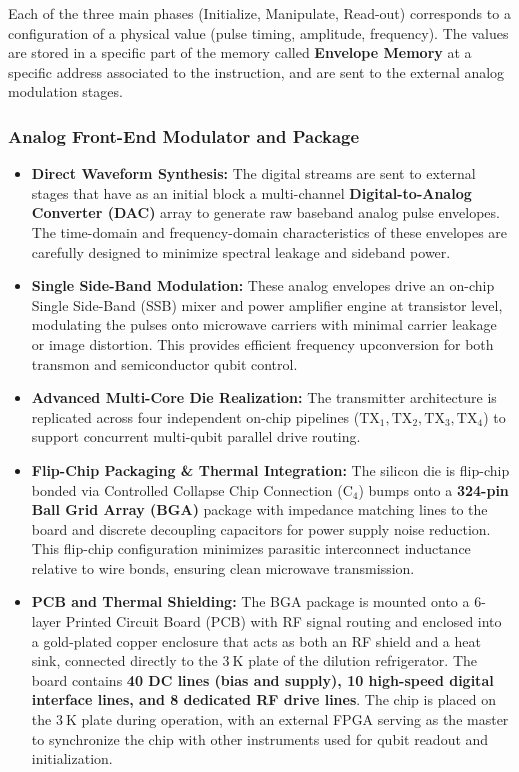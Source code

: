 \documentclass[
]{article}
\providecommand{\tightlist}{%
  \setlength{\itemsep}{0pt}\setlength{\parskip}{0pt}}
\begin{document}
Each of the three main phases (Initialize, Manipulate, Read-out)
corresponds to a configuration of a physical value (pulse timing,
amplitude, frequency). The values are stored in a specific part of the
memory called \textbf{Envelope Memory} at a specific address associated
to the instruction, and are sent to the external analog modulation
stages.

\subsubsection{Analog Front-End Modulator and
Package}\label{analog-front-end-modulator-and-package}

\begin{itemize}
\tightlist
\item
  \textbf{Direct Waveform Synthesis:} The digital streams are sent to
  external stages that have as an initial block a multi-channel
  \textbf{Digital-to-Analog Converter (DAC)} array to generate raw
  baseband analog pulse envelopes. The time-domain and frequency-domain
  characteristics of these envelopes are carefully designed to minimize
  spectral leakage and sideband power.
\item
  \textbf{Single Side-Band Modulation:} These analog envelopes drive an
  on-chip Single Side-Band (SSB) mixer and power amplifier engine at
  transistor level, modulating the pulses onto microwave carriers with
  minimal carrier leakage or image distortion. This provides efficient
  frequency upconversion for both transmon and semiconductor qubit
  control.
\item
  \textbf{Advanced Multi-Core Die Realization:} The transmitter
  architecture is replicated across four independent on-chip pipelines
  (\(\text{TX}_1, \text{TX}_2, \text{TX}_3, \text{TX}_4\)) to support
  concurrent multi-qubit parallel drive routing.
\item
  \textbf{Flip-Chip Packaging \& Thermal Integration:} The silicon die
  is flip-chip bonded via Controlled Collapse Chip Connection
  (\(\text{C}_4\)) bumps onto a \textbf{324-pin Ball Grid Array (BGA)}
  package with impedance matching lines to the board and discrete
  decoupling capacitors for power supply noise reduction. This flip-chip
  configuration minimizes parasitic interconnect inductance relative to
  wire bonds, ensuring clean microwave transmission.
\item
  \textbf{PCB and Thermal Shielding:} The BGA package is mounted onto a
  6-layer Printed Circuit Board (PCB) with RF signal routing and
  enclosed into a gold-plated copper enclosure that acts as both an RF
  shield and a heat sink, connected directly to the \(3\ \text{K}\)
  plate of the dilution refrigerator. The board contains \textbf{40 DC
  lines (bias and supply), 10 high-speed digital interface lines, and 8
  dedicated RF drive lines}. The chip is placed on the \(3\ \text{K}\)
  plate during operation, with an external FPGA serving as the master to
  synchronize the chip with other instruments used for qubit readout and
  initialization.
\end{itemize}
\end{document}
